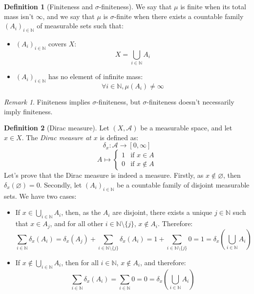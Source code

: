 \documentclass{article}
\theoremstyle{definition}
\newtheorem{definition}{Definition}[section]
\theoremstyle{remark}
\newtheorem*{remark}{Remark}
\theoremstyle{example}
\theoremstyle{notation}
\newcommand{\tif}{\text{if }}
\begin{document}
\begin{definition}[Finiteness and $\sigma$-finiteness]
    We say that $\mu$ is finite when its total mass isn't $\infty$, and we say that $\mu$ is $\sigma$-finite when there exists a countable family $(A_i)_{i \in \mathbb{N}}$ of measurable sets such that:
    \begin{itemize}
        \item $(A_i)_{i \in \mathbb{N}}$ covers $X$:
            $$X = \bigcup_{i \in \mathbb{N}} A_i$$
        \item $(A_i)_{i \in \mathbb{N}}$ has no element of infinite mass:
            $$\forall i \in \mathbb{N}, \mu(A_i) \neq \infty$$
    \end{itemize}
\end{definition}

\begin{remark}
    Finiteness implies $\sigma$-finiteness, but $\sigma$-finiteness doesn't necessarily imply finiteness.
\end{remark}

\begin{definition}[Dirac measure]
    Let $(X, \mathcal{A})$ be a measurable space, and let $x \in X$. The \textit{Dirac measure at $x$} is defined as:
        $$\delta_x : \mathcal{A} \rightarrow [0, \infty]$$
        $$A \mapsto \begin{cases} 1 & \tif x \in A\\ 0 & \tif x \notin A\end{cases}$$
    Let's prove that the Dirac measure is indeed a measure. Firstly, as $x \notin \varnothing$, then $\delta_x(\varnothing) = 0$. Secondly, let $(A_i)_{i \in \mathbb{N}}$ be a countable family of disjoint measurable sets. We have two cases:
    \begin{itemize}
        \item If $x \in \bigcup_{i \in \mathbb{N}} A_i$, then, as the $A_i$ are disjoint, there exists a unique $j \in \mathbb{N}$ such that $x \in A_j$, and for all other $i \in \mathbb{N} \setminus \{j\}$, $x \notin A_i$. Therefore:
            $$\sum_{i \in \mathbb{N}} \delta_x(A_i) = \delta_x(A_j) + \sum_{i \in \mathbb{N} \setminus \{j\}} \delta_x(A_i) = 1 + \sum_{i \in \mathbb{N} \setminus \{j\}} 0 = 1 = \delta_x(\bigcup_{i \in \mathbb{N}} A_i)$$
        \item If $x \notin \bigcup_{i \in \mathbb{N}} A_i$, then for all $i \in \mathbb{N}$, $x \notin A_i$, and therefore:
        $$\sum_{i \in \mathbb{N}} \delta_x(A_i) = \sum_{i \in \mathbb{N}} 0 = 0 = \delta_x(\bigcup_{i \in \mathbb{N}} A_i)$$
    \end{itemize}
\end{definition}
\end{document}

